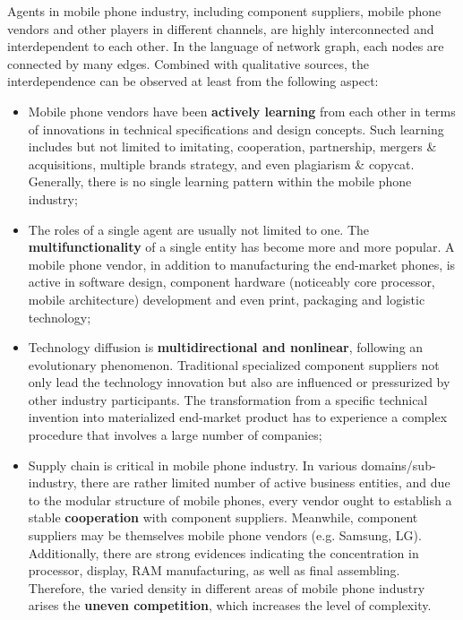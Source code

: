 \documentclass[utf8,english]{gradu3}
\begin{document}
Agents in mobile phone industry, including component suppliers, mobile phone vendors and other players in different channels, are highly interconnected and interdependent to each other. In the language of network graph, each nodes are connected by many edges. Combined with qualitative sources, the interdependence can be observed at least from the following aspect:

\begin{itemize}
\item Mobile phone vendors have been \textbf{actively learning} from each other in terms of innovations in technical specifications and design concepts. Such learning includes but not limited to imitating, cooperation, partnership, mergers \& acquisitions, multiple brands strategy, and even plagiarism \& copycat. Generally, there is no single learning pattern within the mobile phone industry;
\item The roles of a single agent are usually not limited to one. The \textbf{multifunctionality} of a single entity has become more and more popular. A mobile phone vendor, in addition to manufacturing the end-market phones, is active in software design, component hardware (noticeably core processor, mobile architecture) development and even print, packaging and logistic technology;
\item Technology diffusion is \textbf{multidirectional and nonlinear}, following an evolutionary phenomenon. Traditional specialized component suppliers not only lead the technology innovation but also are influenced or pressurized by other industry participants. The transformation from a specific technical invention into materialized end-market product has to experience a complex procedure that involves a large number of companies;
\item Supply chain is critical in mobile phone industry. In various domains/sub-industry, there are rather limited number of active business entities, and due to the modular structure of mobile phones, every vendor ought to establish a stable \textbf{cooperation} with component suppliers. Meanwhile, component suppliers may be themselves mobile phone vendors (e.g. Samsung, LG). Additionally, there are strong evidences indicating the concentration in processor, display, RAM manufacturing, as well as final assembling. Therefore, the varied density in different areas of mobile phone industry arises the \textbf{uneven competition}, which increases the level of complexity.
\end{itemize}
\end{document}
